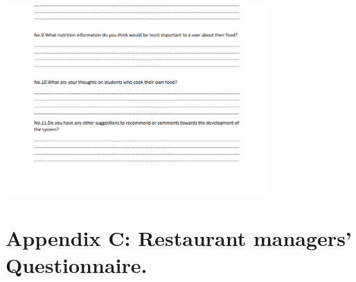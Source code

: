 \documentclass{article}
\begin{document}
\begin{center}
\includegraphics[width=380px]{images/doctors4.PNG} 
\end{center}

\newpage
\appendix
\renewcommand{\thesection}{} %
\section{Appendix C: Restaurant managers' Questionnaire.}
\end{document}
